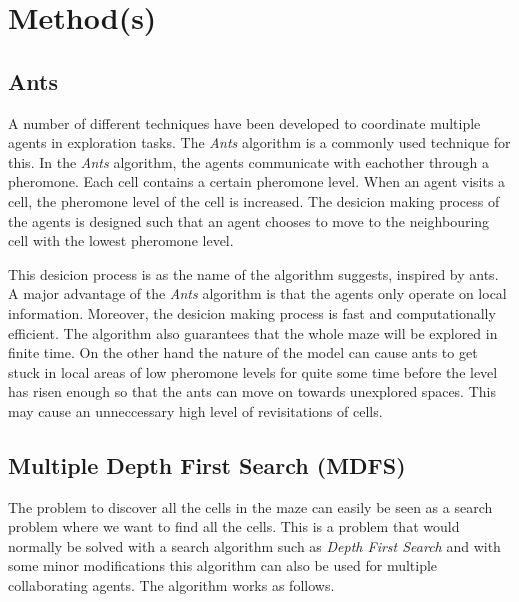 \documentclass{article}
\begin{document}
\section{Method(s)}

\subsection{Ants}
A number of different techniques have been developed to coordinate multiple
agents in exploration tasks. The \textit{Ants} algorithm is a commonly used
technique for this. In the \textit{Ants} algorithm, the agents communicate with
eachother through a pheromone. Each cell contains a certain
pheromone level. When an agent visits a cell, the pheromone level of the cell is
increased. The desicion making process of the agents is designed such that an
agent chooses to move to the neighbouring cell with the lowest pheromone level.

This desicion process is as the name of the algorithm suggests, inspired by
ants. A major advantage of the \textit{Ants} algorithm is that the
agents only operate on local information. Moreover, the desicion making process is
fast and computationally efficient. The algorithm also guarantees that the whole
maze will be explored in finite time. On the other hand the nature of the model
can cause ants to get stuck in local areas of low pheromone levels for quite
some time before the level has risen enough so that the ants can move on towards
unexplored spaces. This may cause an unneccessary high level of revisitations of cells.

\subsection{Multiple Depth First Search (MDFS)}
The problem to discover all the cells in the maze can easily be seen as a search
problem where we want to find all the cells. This is a problem that would
normally be solved with a search algorithm such as \textit{Depth First Search}
and with some minor modifications this algorithm can also be used for multiple
collaborating agents. The algorithm works as follows.
\end{document}
